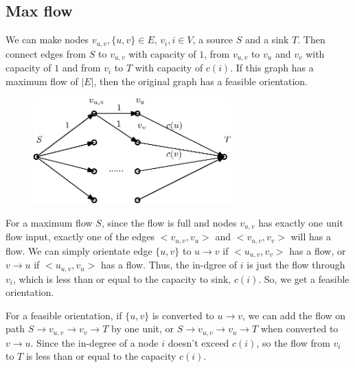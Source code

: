		\subsection{Max flow}
			We can make nodes $v_{u,v},\{u,v\}\in E$, $v_i,i\in V$, a source $S$ and a sink $T$. Then connect edges from $S$ to $v_{u,v}$ with capacity of $1$, from $v_{u,v}$ to $v_u$ and $v_v$ with capacity of $1$ and from $v_i$ to $T$ with capacity of $c(i)$. If this graph has a maximum flow of $|E|$, then the original graph has a feasible orientation.\par
			\begin{figure}[H]
				\centering\includegraphics[width=3in]{source/qwd/qa.eps}
			\end{figure}
			For a maximum flow $S$, since the flow is full and nodes $v_{u,v}$ has exactly one unit flow input, exactly one of the edges $<v_{u,v}, v_u>$ and $<v_{u,v}, v_v>$ will has a flow. We can simply orientate edge $\{u,v\}$ to $u\to v$ if $<u_{u,v}, v_v>$ has a flow, or $v\to u$ if $<u_{u,v}, v_u>$ has a flow. Thus, the in-dgree of $i$ is just the flow through $v_i$, which is less than or equal to the capacity to sink, $c(i)$. So, we get a feasible orientation.\par
			For a feasible orientation, %
			if $\{u, v\}$ is converted to $u\to v$, we can add the flow on path $S\to v_{u, v}\to v_v\to T$ by one unit, or $S\to v_{u, v}\to v_u\to T$ when converted to $v\to u$. Since the in-degree of a node $i$ doesn't exceed $c(i)$, so the flow from $v_i$ to $T$ is less than or equal to the capacity $c(i)$.

